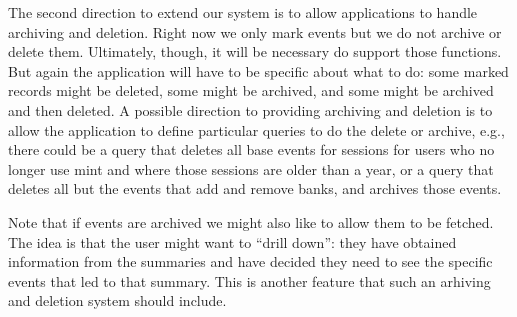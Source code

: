 The second direction to extend our system is to allow applications to handle archiving and deletion. Right now we only mark events but we do not archive or delete them. Ultimately, though, it will be necessary do support those functions. But again the application will have to be specific about what to do: some marked records might be deleted, some might be archived, and some might be archived and then deleted. A possible direction to providing archiving and deletion is to allow the application to define particular queries to do the delete or archive, e.g., there could be a query that deletes all base events for sessions for users who no longer use mint and where those sessions are older than a year, or a query that deletes all but the events that add and remove banks, and archives those events.

Note that if events are archived we might also like to allow them to be fetched. The idea is that the user might want to ``drill down'': they have obtained information from the summaries and have decided they need to see the specific events that led to that summary. This is another feature that such an arhiving and deletion system should include.


